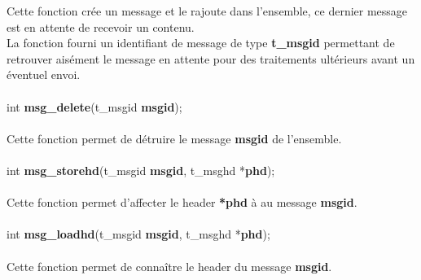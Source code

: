 \documentclass[10pt,a4wide]{article}
\begin{document}
Cette fonction cr\'ee un message et le rajoute dans l'ensemble, ce dernier message est en attente de recevoir un contenu.\\
La fonction fourni un identifiant de message de type \textbf{t\_msgid} permettant de retrouver ais\'ement le message en attente pour
des traitements ult\'erieurs avant un \'eventuel envoi.

\paragraph{}

\hspace{1.5cm}int \textbf{msg\_delete}(t\_msgid \textbf{msgid});

\paragraph{}

Cette fonction permet de d\'etruire le message \textbf{msgid} de l'ensemble.

\paragraph{}

\hspace{1.5cm}int \textbf{msg\_storehd}(t\_msgid \textbf{msgid},
                                        t\_msghd *\textbf{phd});

\paragraph{}

Cette fonction permet d'affecter le header \textbf{*phd} \`a au message \textbf{msgid}.\\

\paragraph{}

\hspace{1.5cm}int \textbf{msg\_loadhd}(t\_msgid \textbf{msgid},
                                       t\_msghd *\textbf{phd});

\paragraph{}

Cette fonction permet de conna\^itre le header du message \textbf{msgid}.
\end{document}
